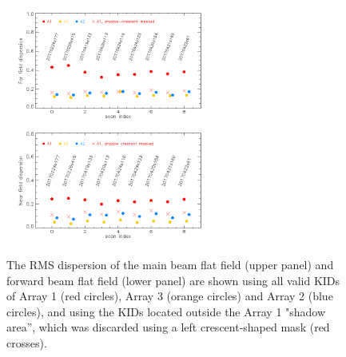 \begin{figure}[ht] 
\begin{center}
  \includegraphics[width=0.6\textwidth]{Figures/FlatFields/Dispersion_main_beam_flat_field_N2R9_10_.png}
  \includegraphics[width=0.6\textwidth]{Figures/FlatFields/Dispersion_forward_beam_flat_field_N2R9_10_.png}
\caption[Dispersion of the flat field for nine \emph{beammap} scans.]{The RMS dispersion of the main beam flat field (upper panel) and forward beam flat field (lower panel) are shown using all valid KIDs of Array 1 (red circles), Array 3 (orange circles) and Array 2 (blue circles), and using the KIDs located outside the Array 1 "shadow area'', which was discarded using a left crescent-shaped mask (red crosses).}
 \label{fig:stddev_ff}
\end{center}
\end{figure}
